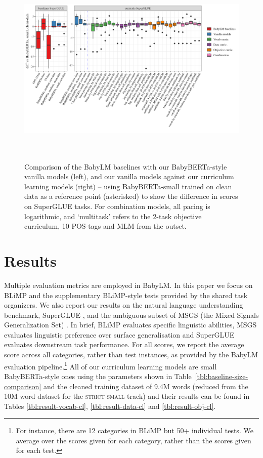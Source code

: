 \begin{figure}
    \centering
    \includegraphics[height=9.5cm]{chapters/climb/figures/babylm_superglue_diffs_boxplots.png}
    \caption{\label{fig:glue-boxplots} Comparison of the BabyLM baselines with our BabyBERTa-style vanilla models (left), and our vanilla models against our curriculum learning models (right) -- using BabyBERTa-small trained on clean data as a reference point (asterisked) to show the difference in scores on SuperGLUE tasks. For combination models, all pacing is logarithmic, and `multitask' refers to the 2-task objective curriculum, 10 POS-tags and MLM from the outset. 
    }
\end{figure}

\section{Results}

Multiple evaluation metrics are employed in BabyLM. In this paper we focus on BLiMP \cite{warstadt2020blimp} and the supplementary BLiMP-style tests provided by the shared task organizers. We also report our results on the natural language understanding benchmark, SuperGLUE \cite{wang2019superglue}, and the ambiguous subset of MSGS (the Mixed Signals Generalization Set) \cite{warstadt2020msgs}. In brief, BLiMP evaluates specific linguistic abilities, MSGS evaluates linguistic preference over surface generalisation and SuperGLUE evaluates downstream task performance. For all scores, we report the average score across all categories, rather than test instances, as provided by the BabyLM evaluation pipeline.\footnote{For instance, there are 12 categories in BLiMP but 50+ individual tests. We average over the scores given for each category, rather than the scores given for each test.} All of our curriculum learning models are small BabyBERTa-style ones using the parameters shown in Table~\ref{tbl:baseline-size-comparison} and the cleaned training dataset of 9.4M words (reduced from the 10M word dataset for the \textsc{strict-small} track) and their results can be found in Tables \ref{tbl:result-vocab-cl}, \ref{tbl:result-data-cl} and \ref{tbl:result-obj-cl}. 

